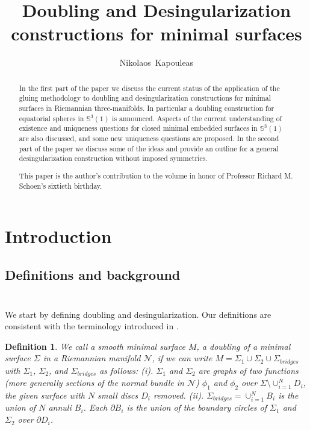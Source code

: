 \documentclass[12pt,namelimits,sumlimits]{amsart}
\newtheorem{definition}[theorem]{Definition}
\theoremstyle{remark}
\numberwithin{equation}{section}
\begin{document}
\title[Doubling and Desingularization]{Doubling and Desingularization constructions for minimal surfaces}

\author[N.~Kapouleas]{Nikolaos~Kapouleas}
\address{Department of Mathematics, Brown University, Providence,
RI 02912} 


\begin{abstract}
In the first part of the paper we discuss the current status of
the application of the gluing methodology to
doubling and desingularization constructions
for minimal surfaces in Riemannian three-manifolds.
In particular a doubling construction for equatorial spheres in ${\mathbb{S}}^3(1)$ is announced.
Aspects of the current understanding of existence and uniqueness questions
for closed minimal embedded surfaces in ${\mathbb{S}}^3(1)$ are also discussed,
and some new uniqueness questions are proposed.
In the second part of the paper we discuss some of the ideas and provide an outline
for a general desingularization construction without imposed symmetries.

This paper is the author's contribution to the
volume in honor of Professor Richard M. Schoen's sixtieth birthday.
\end{abstract}

\maketitle

\section{Introduction}
\label{Sintrod}
\nopagebreak

\subsection*{Definitions and background}
$\phantom{ab}$
\nopagebreak

We start by defining doubling and desingularization.
Our definitions are consistent with the terminology introduced in
\cite{kapouleas:survey,kapouleas:finite,kapouleas:clifford}.

\addtocounter{equation}{1}
\begin{definition}
\label{Ddoubling}
We call a smooth minimal surface $M$,
a doubling of a minimal surface $\Sigma$ in a Riemannian manifold ${{\mathcal{N}}}$,
if we can write $M=\Sigma_1\cup\Sigma_2\cup \Sigma_{bridges}$
with $\Sigma_1$, $\Sigma_2$, and $\Sigma_{bridges}$ as follows:
\newline
(i).
$\Sigma_1$ and $\Sigma_2$ are graphs of two
functions (more generally sections of the normal bundle in ${{\mathcal{N}}}$)
$\phi_1$ and $\phi_2$ over $\Sigma\setminus\cup_{i=1}^N D_i$,
the given surface with $N$ small discs $D_i$ removed.
\newline
(ii).
$\Sigma_{bridges}=\cup_{i=1}^N B_i$
is the union of $N$ annuli $B_i$.
Each $\partial B_i$ is the union of the boundary circles
of $\Sigma_1$ and $\Sigma_2$ over $\partial D_i$.
\end{definition}
\end{document}
